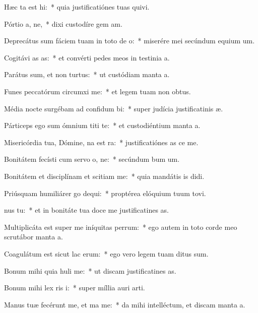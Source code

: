 \item Hæc ta est hi:~* quia justificatiónes tuas quivi.
\item Pórtio a, ne,~* dixi custodíre gem am.
\item Deprecátus sum fáciem tuam in toto de o:~* miserére mei secúndum equium um.
\item Cogitávi as as:~* et convérti pedes meos in testinia a.
\item Parátus sum, et non  turtus:~* ut custódiam manta a.
\item Funes peccatórum circumxi  me:~* et legem tuam non  obtus.
\item Média nocte surgébam ad confidum bi:~* super judícia justificatinis æ.
\item Párticeps ego sum ómnium titi te:~* et custodiéntium manta a.
\item Misericórdia tua, Dómine, na est ra:~* justificatiónes as ce me.
\item Bonitátem fecísti cum servo o, ne:~* secúndum bum um.
\item Bonitátem et disciplínam et scitiam  me:~* quia mandátis is didi.
\item Priúsquam humiliárer go dequi:~* proptérea elóquium tuum tovi.
\item {}nus  tu:~* et in bonitáte tua doce me justificatines as.
\item Multiplicáta est super me iníquitas perrum:~* ego autem in toto corde meo scrutábor manta a.
\item Coagulátum est sicut lac  erum:~* ego vero legem tuam ditus sum.
\item Bonum mihi quia huli me:~* ut discam justificatines as.
\item Bonum mihi lex ris i:~* super míllia auri  arti.
\item Manus tuæ fecérunt me, et ma me:~* da mihi intelléctum, et discam manta a.
